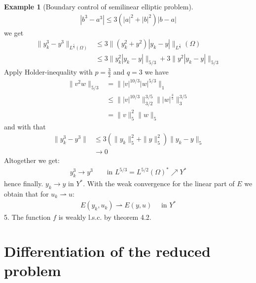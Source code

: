 \documentclass[a4paper,11pt,fleqn]{book}
\theoremstyle{definition}
\newtheorem*{example}{Example}
\theoremstyle{remark}
\begin{document}
\begin{example}[Boundary control of semilinear elliptic problem]
\begin{align*}
			|b^3 - a^3| \le 3(|a|^2 + |b|^2)|b - a|
		\end{align*}
		we get 
		\begin{align*}
			\|y_k^3 - y^3\|_{L^{\frac{5}{3}}(\Omega)} &\le 3 \|(y_k^2 + y^2)|y_k - y|\|_{L^{\frac{5}{3}}}(\Omega)\\
			&\le 3\|y_k^2|y_k - y|\|_{5\slash3} + 3 \|y^2 |y_k - y|\|_{5 \slash 3}
		\end{align*}
		Apply Holder-inequality with $p = \frac{3}{2}$ and $q = 3$ we have
		\begin{align*}
			\|v^2 w \|_{5 \slash 3} &= \| |v|^{10\slash 3} |w|^{5 \slash 3} \|_1 \\
			&\le \||v|^{10 \slash 3}\|^{3 \slash 5}_{3 \slash 2} \||w|^{\frac{3}{5}}\|_3^{3 \slash 5} \\
			&=  \|v\|^2_5 \|w\|_5
		\end{align*}
		and with that
		\begin{align*}
			\|y_k^3 - y^3\| &\le 3 (\|y_k\|^2_5 + \|y\|_5^2)\|y_k - y\|_5\\
			&\rightarrow 0
		\end{align*}
		Altogether we get:
		\begin{align*}
			y_k^3 \rightarrow y^3 \qquad \text{in } L^{5 \slash 3} = L^{5 \slash 2}(\Omega)^* \nearrow Y^*
		\end{align*}
		hence finally. $y_k \rightarrow y$ in $Y^*$. With the weak convergence for the linear part of $E$ we obtain that for $u_k \rightharpoonup u$:
		\begin{align*}
			E(y_k, u_k) \rightharpoonup E(y, u) \quad \text{ in } Y^*
		\end{align*}
		5. The function $f$ is weakly l.s.c. by theorem 4.2.
\end{example}


\newpage
\section{Differentiation of the reduced problem}
\end{document}
